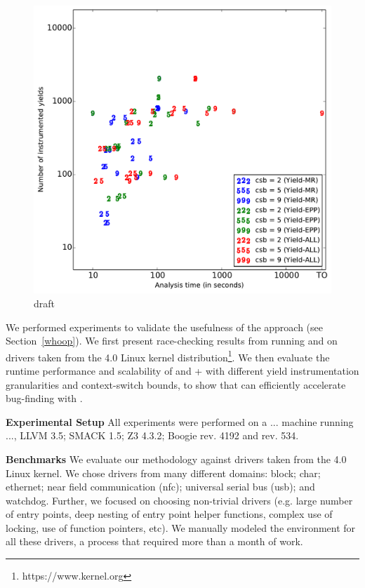 \begin{figure}
\centering
\includegraphics[width=.99\linewidth]{experiments/figures/correlation.pdf}
\caption{draft}
\label{fig:plot2}
\end{figure}

We performed experiments to validate the usefulness of the \whoop approach (see Section~\ref{whoop}). We first present race-checking results from running \whoop and \corral on \sizeOfBenchmarks drivers taken from the 4.0 Linux kernel distribution\footnote{https://www.kernel.org}. We then evaluate the runtime performance and scalability of \corral and \whoop + \corral with different yield instrumentation granularities and context-switch bounds, to show that \whoop can efficiently accelerate bug-finding with \corral.

\noindent
\textbf{Experimental Setup}\xspace\xspace All experiments were performed on a ... machine running ..., LLVM 3.5; SMACK 1.5; Z3 4.3.2; Boogie rev. 4192 and \corral rev. 534.

\noindent
\textbf{Benchmarks}\xspace\xspace We evaluate our methodology against \sizeOfBenchmarks drivers taken from the 4.0 Linux kernel. We chose drivers from many different domains: block; char; ethernet; near field communication (nfc); universal serial bus (usb); and watchdog. Further, we focused on choosing non-trivial drivers (e.g. large number of entry points, deep nesting of entry point helper functions, complex use of locking, use of function pointers, etc). We manually modeled the environment for all these drivers, a process that required more than a month of work.

